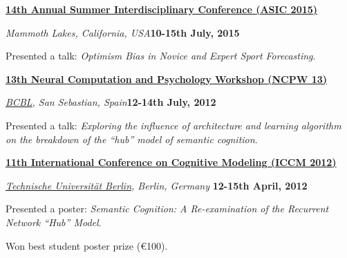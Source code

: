\href{http://www.cogs.indiana.edu/asic/2015/index.shtml}{\textbf{ 14th Annual Summer Interdisciplinary Conference (ASIC 2015)}}



\begin{outerlist}
\item[] \textit{Mammoth Lakes, California, USA}\hfill\textbf{10-15th July, 2015}

\begin{innerlist}
\item Presented a talk: \textit{Optimism Bias in Novice and Expert Sport Forecasting}.
\end{innerlist}

\end{outerlist}
\blankline

\href{http://www.bcbl.eu/events/ncpw13/}{\textbf{13th Neural Computation and Psychology Workshop (NCPW 13)}}



\begin{outerlist}
\item[] \textit{\href{http://www.bcbl.eu/}{BCBL}, San Sebastian, Spain}\hfill\textbf{12-14th July, 2012}

\begin{innerlist}
\item Presented a talk: \textit{Exploring the influence of architecture and learning algorithm on the breakdown of the ``hub'' model of semantic cognition}.
\end{innerlist}

\end{outerlist}
\blankline

\href{http://iccm-conference.org/2012/}{\textbf{11th International Conference on Cognitive Modeling (ICCM 2012)}}

\begin{outerlist}
\item[] \textit{\href{http://www.tu-berlin.de/menue/home/parameter/en/}{Technische Universit\"{a}t Berlin}, Berlin, Germany}
        \hfill \textbf{12-15th April, 2012}
\begin{innerlist}
\item Presented a poster: \textit{Semantic Cognition: A Re-examination of the Recurrent Network ``Hub'' Model}.
\item Won best student poster prize (\euro 100).

\end{innerlist}

\end{outerlist}


